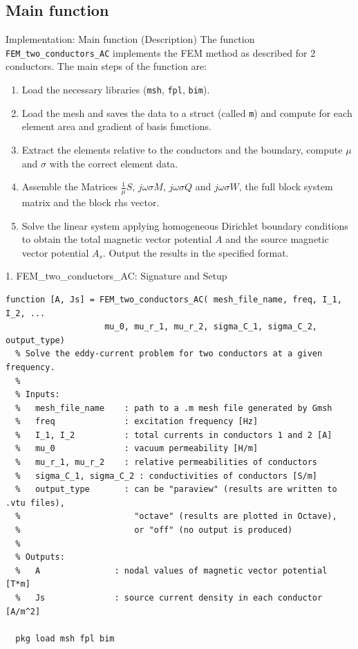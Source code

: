 \documentclass[aspectratio=54,xcolor=dvipsnames]{beamer}
\begin{document}
\subsection{Main function}
\begin{frame}{Implementation: Main function (Description)}
    The function \texttt{FEM\_two\_conductors\_AC} implements the FEM method as described for 2 conductors. The main steps of the function are:
    \begin{enumerate}
        \item Load the necessary libraries (\texttt{msh}, \texttt{fpl}, \texttt{bim}).
        \item Load the mesh and saves the data to a struct (called \texttt{m}) and compute for each element area and gradient of basis functions.
        \item Extract the elements relative to the conductors and the boundary, compute $\mu$ and $\sigma$ with the correct element data.
        \item Assemble the Matrices $\frac{1}{\mu}S$, $j \omega \sigma M$, $j \omega \sigma Q$ and $j \omega \sigma W$, the full block system matrix and the block rhs vector.
        \item Solve the linear system applying homogeneous Dirichlet boundary conditions to obtain the total magnetic vector potential $A$ and the source magnetic vector potential $A_s$. Output the results in the specified format.
    \end{enumerate} 
\end{frame}

\begin{frame}[fragile]{1. FEM\_two\_conductors\_AC: Signature and Setup}
\small
\begin{lstlisting}
function [A, Js] = FEM_two_conductors_AC( mesh_file_name, freq, I_1, I_2, ...
                    mu_0, mu_r_1, mu_r_2, sigma_C_1, sigma_C_2, output_type)
  % Solve the eddy-current problem for two conductors at a given frequency.
  %
  % Inputs:
  %   mesh_file_name    : path to a .m mesh file generated by Gmsh
  %   freq              : excitation frequency [Hz]
  %   I_1, I_2          : total currents in conductors 1 and 2 [A]
  %   mu_0              : vacuum permeability [H/m]
  %   mu_r_1, mu_r_2    : relative permeabilities of conductors
  %   sigma_C_1, sigma_C_2 : conductivities of conductors [S/m]
  %   output_type       : can be "paraview" (results are written to .vtu files),
  %                       "octave" (results are plotted in Octave),
  %                       or "off" (no output is produced)
  %
  % Outputs:
  %   A               : nodal values of magnetic vector potential [T*m]
  %   Js              : source current density in each conductor [A/m^2]

  pkg load msh fpl bim

\end{lstlisting}
\end{frame}
\end{document}
